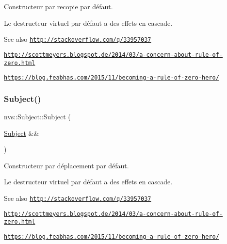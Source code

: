 Constructeur par recopie par défaut. 

Le destructeur virtuel par défaut a des effets en cascade.

\begin{DoxySeeAlso}{See also}
\href{http://stackoverflow.com/q/33957037}{\tt http\+://stackoverflow.\+com/q/33957037} 

\href{http://scottmeyers.blogspot.de/2014/03/a-concern-about-rule-of-zero.html}{\tt http\+://scottmeyers.\+blogspot.\+de/2014/03/a-\/concern-\/about-\/rule-\/of-\/zero.\+html} 

\href{https://blog.feabhas.com/2015/11/becoming-a-rule-of-zero-hero/}{\tt https\+://blog.\+feabhas.\+com/2015/11/becoming-\/a-\/rule-\/of-\/zero-\/hero/} 
\end{DoxySeeAlso}
\mbox{\label{classnvs_1_1_subject_a228776e466dd330075d3f4a089c006f4}} 
\subsubsection{\texorpdfstring{Subject()}{Subject()}\hspace{0.1cm}{\footnotesize\ttfamily [2/2]}}
{\footnotesize\ttfamily nvs\+::\+Subject\+::\+Subject (\begin{DoxyParamCaption}\item[{\mbox{\hyperlink{classnvs_1_1_subject}{Subject}} \&\&}]{ }\end{DoxyParamCaption})\hspace{0.3cm}{\ttfamily [default]}}



Constructeur par déplacement par défaut. 

Le destructeur virtuel par défaut a des effets en cascade.

\begin{DoxySeeAlso}{See also}
\href{http://stackoverflow.com/q/33957037}{\tt http\+://stackoverflow.\+com/q/33957037} 

\href{http://scottmeyers.blogspot.de/2014/03/a-concern-about-rule-of-zero.html}{\tt http\+://scottmeyers.\+blogspot.\+de/2014/03/a-\/concern-\/about-\/rule-\/of-\/zero.\+html} 

\href{https://blog.feabhas.com/2015/11/becoming-a-rule-of-zero-hero/}{\tt https\+://blog.\+feabhas.\+com/2015/11/becoming-\/a-\/rule-\/of-\/zero-\/hero/} 
\end{DoxySeeAlso}


